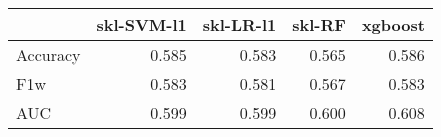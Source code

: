 \begin{tabular}{lrrrr}
\toprule
{} &  skl-SVM-l1 &  skl-LR-l1 &  skl-RF &  xgboost \\
\midrule
Accuracy &       0.585 &      0.583 &   0.565 &    0.586 \\
F1w      &       0.583 &      0.581 &   0.567 &    0.583 \\
AUC      &       0.599 &      0.599 &   0.600 &    0.608 \\
\bottomrule
\end{tabular}
